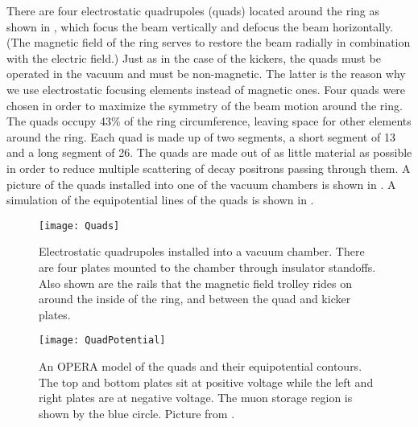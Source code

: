 There are four electrostatic quadrupoles (quads) located around the ring as shown in , which focus the beam vertically and defocus the beam horizontally. (The magnetic field of the ring serves to restore the beam radially in combination with the electric field.) Just as in the case of the kickers, the quads must be operated in the vacuum and must be non-magnetic. The latter is the reason why we use electrostatic focusing elements instead of magnetic ones. Four quads were chosen in order to maximize the symmetry of the beam motion around the ring. The quads occupy 43\% of the ring circumference, leaving space for other elements around the ring. Each quad is made up of two segments, a short segment of 13\textdegree{} and a long segment of 26\textdegree{}. The quads are made out of as little material as possible in order to reduce multiple scattering of decay positrons passing through them. A picture of the quads installed into one of the vacuum chambers is shown in . A simulation of the equipotential lines of the quads is shown in . 

\begin{figure}[]
    \centering
    \texttt{[image: Quads]}
    \caption[Electrostatic quadrupoles installed in a vacuum chamber]{Electrostatic quadrupoles installed into a vacuum chamber. There are four plates mounted to the chamber through insulator standoffs. Also shown are the rails that the magnetic field trolley rides on around the inside of the ring, and between the quad and kicker plates.}   
    \label{fig:Quads}
\end{figure}

\begin{figure}[]
    \centering
    \texttt{[image: QuadPotential]}
    \caption[Electrostatic quadrupole potentials]{An OPERA model of the quads and their equipotential contours. The top and bottom plates sit at positive voltage while the left and right plates are at negative voltage. The muon storage region is shown by the blue circle. Picture from .}   
    \label{fig:QuadPotential}
\end{figure}


